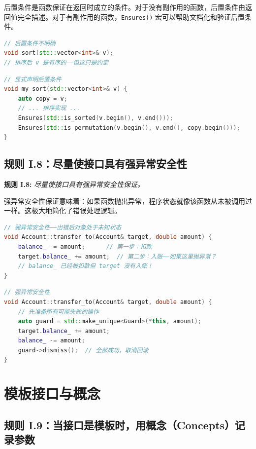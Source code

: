 后置条件是函数保证在返回时成立的条件。对于没有副作用的函数，后置条件由返回值完全描述。对于有副作用的函数，\texttt{Ensures()} 宏可以帮助文档化和验证后置条件。

\begin{lstlisting}[language=C++]
// 后置条件不明确
void sort(std::vector<int>& v);
// 排序后 v 是有序的——但这只是约定
\end{lstlisting}

\begin{lstlisting}[language=C++]
// 显式声明后置条件
void my_sort(std::vector<int>& v) {
    auto copy = v;
    // ... 排序实现 ...
    Ensures(std::is_sorted(v.begin(), v.end()));
    Ensures(std::is_permutation(v.begin(), v.end(), copy.begin()));
}
\end{lstlisting}

\subsection{规则 I.8：尽量使接口具有强异常安全性}

\textbf{规则 I.8:} \textit{尽量使接口具有强异常安全性保证。}

强异常安全性保证意味着：如果函数抛出异常，程序状态就像该函数从未被调用过一样。这极大地简化了错误处理逻辑。

\begin{lstlisting}[language=C++]
// 弱异常安全性——出错后对象处于未知状态
void Account::transfer_to(Account& target, double amount) {
    balance_ -= amount;      // 第一步：扣款
    target.balance_ += amount;  // 第二步：入账——如果这里抛异常？
    // balance_ 已经被扣款但 target 没有入账！
}
\end{lstlisting}

\begin{lstlisting}[language=C++]
// 强异常安全性
void Account::transfer_to(Account& target, double amount) {
    // 先准备所有可能失败的操作
    auto guard = std::make_unique<Guard>(*this, amount);
    target.balance_ += amount;
    balance_ -= amount;
    guard->dismiss();  // 全部成功，取消回滚
}
\end{lstlisting}

\section{模板接口与概念}

\subsection{规则 I.9：当接口是模板时，用概念（Concepts）记录参数}

